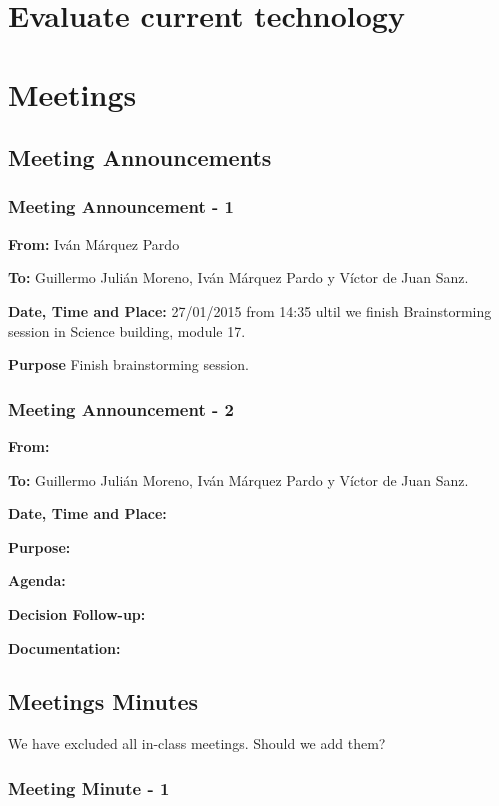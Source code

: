 \documentclass{report}
\begin{document}



\chapter{Evaluate current technology}
\newpage

\chapter{Meetings}


\section{Meeting Announcements}
\subsection{Meeting Announcement - 1}

\textbf{From: } Iván Márquez Pardo

\textbf{To: } Guillermo Julián Moreno, Iván Márquez Pardo y Víctor de Juan Sanz.

\textbf{Date, Time and Place: } 27/01/2015 from 14:35 ultil we finish Brainstorming session in Science building, module 17.

\textbf{Purpose} Finish brainstorming session.

\subsection{Meeting Announcement - 2}


\textbf{From: }

\textbf{To: } Guillermo Julián Moreno, Iván Márquez Pardo y Víctor de Juan Sanz.


\textbf{Date, Time and Place: }


\textbf{Purpose: }


\textbf{Agenda: }

\textbf{Decision Follow-up: }


\textbf{Documentation: }


\section{Meetings Minutes}

We have excluded all in-class meetings. Should we add them?

\subsection{Meeting Minute - 1}
\end{document}
